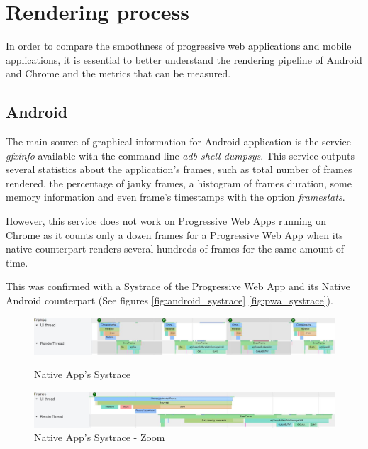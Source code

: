 \documentclass{kththesis}
\begin{document}
\section{Rendering process}
    
    In order to compare the smoothness of progressive web applications and mobile applications, it is essential to better understand the rendering pipeline of Android and Chrome and the metrics that can be measured.
    
    \subsection{Android}
        
    The main source of graphical information for Android application is the service \textit{gfxinfo} available with the command line \textit{adb shell dumpsys}. This service outputs several statistics about the application's frames, such as total number of frames rendered, the percentage of janky frames, a histogram of frames duration, some memory information and even frame's timestamps with the option \textit{framestats}.
    
    However, this service does not work on Progressive Web Apps running on Chrome as it counts only a dozen frames for a Progressive Web App when its native counterpart renders several hundreds of frames for the same amount of time. 
    
    This was confirmed with a Systrace of the Progressive Web App and its Native Android counterpart (See figures \ref{fig:android_systrace} \ref{fig:pwa_systrace}).
    \begin{figure}[!ht]
        \includegraphics[width=15cm]{kththesis/Figures/android_systrace_frame.jpg}
        \caption{Native App's Systrace}
        \label{fig:android_systrace}
        \includegraphics[width=15cm]{kththesis/Figures/android_systrace_zoom.jpg}
        \caption{Native App's Systrace - Zoom}
        \label{fig:android_systrace_zoom}
    \end{figure}
    
\end{document}
